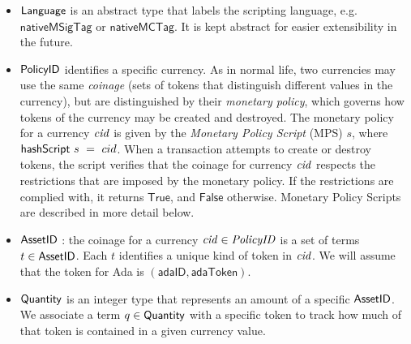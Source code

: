 \begin{itemize}

  \item $\mathsf{Language}$ is an abstract type that labels the scripting language, e.g.
    $\mathsf{nativeMSigTag}$ or $\mathsf{nativeMCTag}$. It is kept abstract for easier extensibility in the future.

  \item $\mathsf{PolicyID}$ identifies a specific currency.  As in normal life, two
    currencies may use the same \emph{coinage} (sets of tokens that distinguish different values in the currency),
    but are distinguished by their \emph{monetary policy}, which governs how tokens of the currency may be created
    and destroyed.
    The monetary policy for a currency $\mathit{cid}$ is given by the \emph{Monetary Policy Script}
    (MPS) $s$, where $\mathsf{hashScript}~s~=~cid$. When a transaction attempts to create or destroy tokens,
    the script verifies that the coinage for currency $\mathit{cid}$
    respects the restrictions that are imposed by the
    monetary policy. If the restrictions are complied with, it returns
    $\mathsf{True}$, and
    $\mathsf{False}$ otherwise.  Monetary Policy Scripts are described in more detail below.



  \item $\mathsf{AssetID}$ : the coinage for a currency $\mathit{cid} \in \mathit{PolicyID}$ is a set of terms
    $t\in\mathsf{AssetID}$.  Each $t$ identifies a unique kind of token in $\mathit{cid}$.
    We will assume that the token for Ada is $(\mathsf{adaID}, \mathsf{adaToken})$.

  \item $\mathsf{Quantity}$ is an integer type that represents an amount of a specific $\mathsf{AssetID}$. We associate
    a term $q\in\mathsf{Quantity}$ with a specific token to track how much of that token is contained in a given currency value.


\end{itemize}
